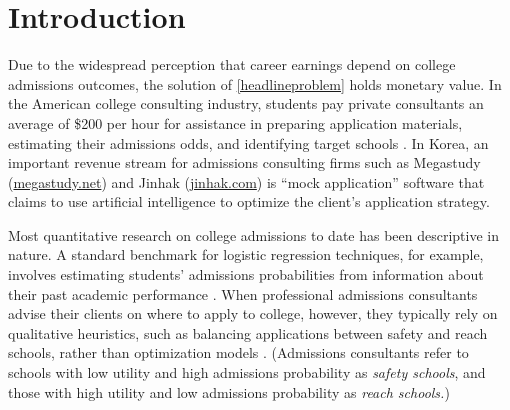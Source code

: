 \section{Introduction}

Due to the widespread perception that career earnings depend on college admissions outcomes, the solution of \eqref{headlineproblem} holds monetary value. In the American college consulting industry, students pay private consultants an average of \$200 per hour for assistance in preparing application materials, estimating their admissions odds, and identifying target schools \cite{sklarow2018}. In Korea, an important revenue stream for admissions consulting firms such as Megastudy (\url{megastudy.net}) and Jinhak (\url{jinhak.com}) is ``mock application'' software that claims to use artificial intelligence to optimize the client's application strategy. 

Most quantitative research on college admissions to date has been descriptive in nature. A standard benchmark for logistic regression techniques, for example, involves estimating students' admissions probabilities from information about their past academic performance \cite{acharyaetal2019,lim2013}. When professional admissions consultants advise their clients on where to apply to college, however, they typically rely on qualitative heuristics, such as balancing applications between safety and reach schools, rather than optimization models \cite{jeon2015,peck2021}. (Admissions consultants refer to schools with low utility and high admissions probability as \emph{safety schools}, and those with high utility and low admissions probability as \emph{reach schools.})

